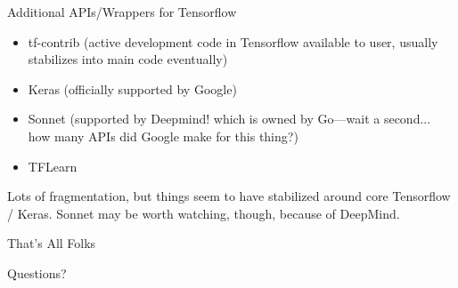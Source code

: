 \documentclass[]{beamer}
\begin{document}
\begin{frame}{Additional APIs/Wrappers for Tensorflow}

\begin{itemize}
\item tf-contrib (active development code in Tensorflow available to user, usually stabilizes into main code eventually)
\item Keras (officially supported by Google)
\item Sonnet (supported by Deepmind! which is owned by Go---wait a second... how many APIs did Google make for this thing?)
\item TFLearn
\end{itemize}

Lots of fragmentation, but things seem to have stabilized around core Tensorflow / Keras. Sonnet may be worth watching, though, because of DeepMind. 

\end{frame}

\begin{frame}{That's All Folks}

Questions?

\end{frame}
\end{document}
